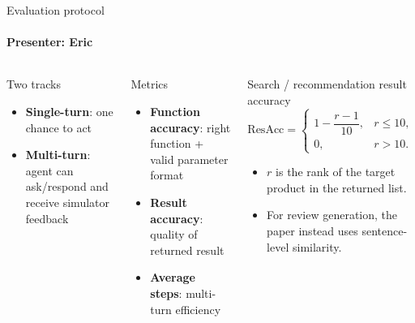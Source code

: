 \documentclass[10pt]{beamer}
\newcommand{\speaker}[1]{\framesubtitle{Presenter: #1}}
\begin{document}
\begin{frame}{Evaluation protocol}
  \speaker{Eric}
  \begin{columns}[T,onlytextwidth]
      \begin{block}{Two tracks}
        \small
        \begin{itemize}
          \item \textbf{Single-turn}: one chance to act
          \item \textbf{Multi-turn}: agent can ask/respond and receive simulator feedback
        \end{itemize}
      \end{block}
      \begin{block}{Metrics}
        \small
        \begin{itemize}
          \item \textbf{Function accuracy}: right function + valid parameter format
          \item \textbf{Result accuracy}: quality of returned result
          \item \textbf{Average steps}: multi-turn efficiency
        \end{itemize}
      \end{block}
      \begin{block}{Search / recommendation result accuracy}
        \small
        \[
        \mathrm{ResAcc}=
        \begin{cases}
          1-\dfrac{r-1}{10}, & r \le 10,\\[0.4em]
          0, & r > 10.
        \end{cases}
        \]
        \vspace{-0.8em}
        \begin{itemize}
          \item $r$ is the rank of the target product in the returned list.
          \item For review generation, the paper instead uses sentence-level similarity.
        \end{itemize}
      \end{block}
  \end{columns}
\end{frame}
\end{document}

